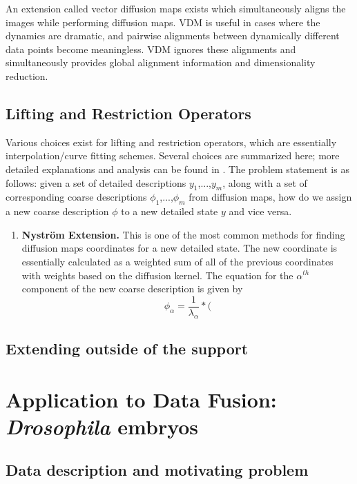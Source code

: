 \documentclass[12pt]{article}
\begin{document}
An extension called vector diffusion maps exists which simultaneously aligns the images while performing diffusion maps. VDM is useful in cases where the dynamics are dramatic, and pairwise alignments between dynamically different data points become meaningless. VDM ignores these alignments and simultaneously provides global alignment information and dimensionality reduction.

\subsection{Lifting and Restriction Operators}

Various choices exist for lifting and restriction operators, which are essentially interpolation/curve fitting schemes. Several choices are summarized here; more detailed explanations and analysis can be found in \cite{Chiavazzo2014}. The problem statement is as follows: given a set of detailed descriptions $y_1$,...,$y_\textit{m}$, along with a set of corresponding coarse descriptions $\phi_1$,...,$\phi_\textit{m}$ from diffusion maps, how do we assign a new coarse description $\phi$ to a new detailed state $y$ and vice versa.

\begin{enumerate}
\item \textbf{Nystr\"om Extension.} This is one of the most common methods for finding diffusion maps coordinates for a new detailed state. The new coordinate is essentially calculated as a weighted sum of all of the previous coordinates with weights based on the diffusion kernel. The equation for the $\alpha^{th}$ component of the new coarse description is given by
\[
\phi_{\alpha} = \frac{1}{\lambda_\alpha}*(
\]



\end{enumerate}

\subsection{Extending outside of the support}

\section{Application to Data Fusion: \textit{Drosophila} embryos}

\subsection{Data description and motivating problem}
\end{document}
